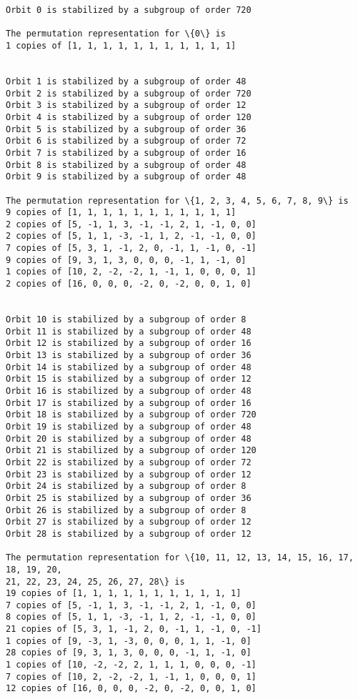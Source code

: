 \documentclass[11pt]{article}
\begin{document}
    \begin{Verbatim}[commandchars=\\\{\}]
Orbit 0 is stabilized by a subgroup of order 720

The permutation representation for \{0\} is
1 copies of [1, 1, 1, 1, 1, 1, 1, 1, 1, 1, 1]


Orbit 1 is stabilized by a subgroup of order 48
Orbit 2 is stabilized by a subgroup of order 720
Orbit 3 is stabilized by a subgroup of order 12
Orbit 4 is stabilized by a subgroup of order 120
Orbit 5 is stabilized by a subgroup of order 36
Orbit 6 is stabilized by a subgroup of order 72
Orbit 7 is stabilized by a subgroup of order 16
Orbit 8 is stabilized by a subgroup of order 48
Orbit 9 is stabilized by a subgroup of order 48

The permutation representation for \{1, 2, 3, 4, 5, 6, 7, 8, 9\} is
9 copies of [1, 1, 1, 1, 1, 1, 1, 1, 1, 1, 1]
2 copies of [5, -1, 1, 3, -1, -1, 2, 1, -1, 0, 0]
2 copies of [5, 1, 1, -3, -1, 1, 2, -1, -1, 0, 0]
7 copies of [5, 3, 1, -1, 2, 0, -1, 1, -1, 0, -1]
9 copies of [9, 3, 1, 3, 0, 0, 0, -1, 1, -1, 0]
1 copies of [10, 2, -2, -2, 1, -1, 1, 0, 0, 0, 1]
2 copies of [16, 0, 0, 0, -2, 0, -2, 0, 0, 1, 0]


Orbit 10 is stabilized by a subgroup of order 8
Orbit 11 is stabilized by a subgroup of order 48
Orbit 12 is stabilized by a subgroup of order 16
Orbit 13 is stabilized by a subgroup of order 36
Orbit 14 is stabilized by a subgroup of order 48
Orbit 15 is stabilized by a subgroup of order 12
Orbit 16 is stabilized by a subgroup of order 48
Orbit 17 is stabilized by a subgroup of order 16
Orbit 18 is stabilized by a subgroup of order 720
Orbit 19 is stabilized by a subgroup of order 48
Orbit 20 is stabilized by a subgroup of order 48
Orbit 21 is stabilized by a subgroup of order 120
Orbit 22 is stabilized by a subgroup of order 72
Orbit 23 is stabilized by a subgroup of order 12
Orbit 24 is stabilized by a subgroup of order 8
Orbit 25 is stabilized by a subgroup of order 36
Orbit 26 is stabilized by a subgroup of order 8
Orbit 27 is stabilized by a subgroup of order 12
Orbit 28 is stabilized by a subgroup of order 12

The permutation representation for \{10, 11, 12, 13, 14, 15, 16, 17, 18, 19, 20,
21, 22, 23, 24, 25, 26, 27, 28\} is
19 copies of [1, 1, 1, 1, 1, 1, 1, 1, 1, 1, 1]
7 copies of [5, -1, 1, 3, -1, -1, 2, 1, -1, 0, 0]
8 copies of [5, 1, 1, -3, -1, 1, 2, -1, -1, 0, 0]
21 copies of [5, 3, 1, -1, 2, 0, -1, 1, -1, 0, -1]
1 copies of [9, -3, 1, -3, 0, 0, 0, 1, 1, -1, 0]
28 copies of [9, 3, 1, 3, 0, 0, 0, -1, 1, -1, 0]
1 copies of [10, -2, -2, 2, 1, 1, 1, 0, 0, 0, -1]
7 copies of [10, 2, -2, -2, 1, -1, 1, 0, 0, 0, 1]
12 copies of [16, 0, 0, 0, -2, 0, -2, 0, 0, 1, 0]



\end{Verbatim}
\end{document}
